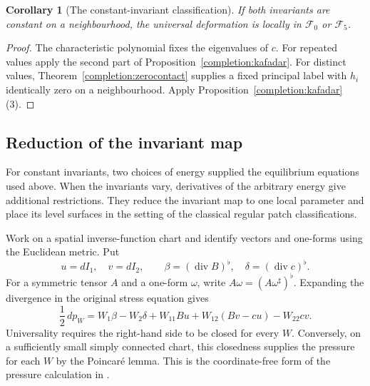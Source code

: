 \documentclass[11pt,a4paper]{article}
\numberwithin{equation}{section}
\theoremstyle{plain}
\newtheorem{corollary}[theorem]{Corollary}
\theoremstyle{definition}
\theoremstyle{remark}
\begin{document}
\begin{corollary}[The constant-invariant classification]
\label{completion:constantclassification}
If both invariants are constant on a neighbourhood, the universal
deformation is locally in $\mathcal F_0$ or $\mathcal F_5$.
\end{corollary}
\begin{proof}
The characteristic polynomial fixes the eigenvalues of $c$.
For repeated values apply the second part of
Proposition~\ref{completion:kafadar}. For distinct values,
Theorem~\ref{completion:zerocontact} supplies a fixed principal label
with $h_i$ identically
zero on a neighbourhood. Apply Proposition~\ref{completion:kafadar}(3).\qedhere
\end{proof}

\subsection{Reduction of the invariant map}
\label{completion:variable-equations}

For constant invariants, two choices of energy supplied the equilibrium
equations used above. When the invariants vary, derivatives of the
arbitrary energy give additional restrictions. They reduce the
invariant map to one local parameter and place its level surfaces in
the setting of the classical regular patch classifications.

Work on a spatial inverse-function
chart and identify vectors and one-forms using the Euclidean metric.
Put
\[
 u=dI_1,\quad v=dI_2,\qquad
 \beta=(\operatorname{div}B)^\flat,\quad
 \delta=(\operatorname{div}c)^\flat.
\]
For a symmetric tensor $A$ and a one-form $\omega$, write
$A\omega=(A\omega^\sharp)^\flat$. Expanding the divergence in the
original stress equation gives
\begin{equation}\label{completion:pressureform}
 \frac12\,dp_W=
 W_1\beta-W_2\delta+W_{11}Bu
                  +W_{12}(Bv-cu)-W_{22}cv.
\end{equation}
Universality requires the right-hand side to be closed for every $W$.
Conversely, on a sufficiently small simply connected chart, this
closedness supplies the pressure for each $W$ by the Poincar\'e lemma.
This is the coordinate-free form of the pressure calculation in
\cite[pp.~468--469, equations (2.1)--(2.2)]{Ericksen1954}.
\end{document}
